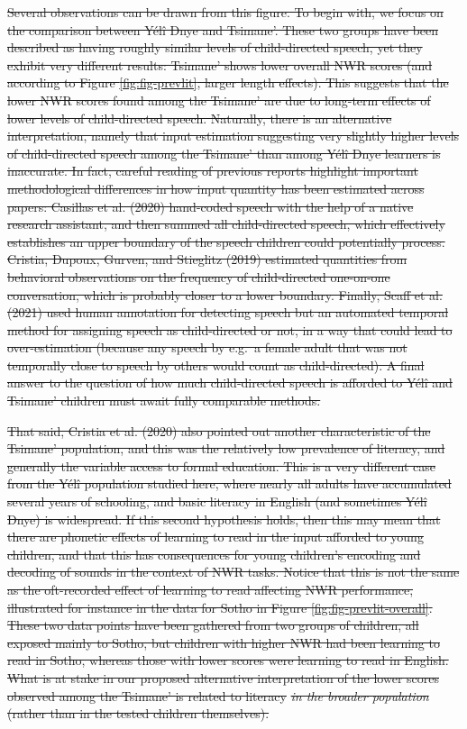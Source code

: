 \documentclass[ %
american, %
,man,floatsintext]{apa6} %
\providecommand{\DIFdeltex}[1]{{\protect\color{red}\sout{#1}}}                      %
\providecommand{\DIFdel}[1]{\texorpdfstring{\DIFdeltex{#1}}{}} %
\begin{document}
\DIFdel{Several observations can be drawn from this figure. To begin with, we focus on the comparison between Yélî Dnye and Tsimane'. These two groups have been described as having roughly similar levels of child-directed speech, yet they exhibit very different results: Tsimane' shows lower overall NWR scores (and according to Figure \ref{fig:fig-prevlit}, larger length effects). This suggests that the lower NWR scores found among the Tsimane' are due to long-term effects of lower levels of child-directed speech. Naturally, there is an alternative interpretation, namely that input estimation suggesting very slightly higher levels of child-directed speech among the Tsimane' than among Yélî Dnye learners is inaccurate. In fact, careful reading of previous reports highlight important methodological differences in how input quantity has been estimated across papers: Casillas et al. (2020) hand-coded speech with the help of a native research assistant, and then summed all child-directed speech, which effectively establishes an upper boundary of the speech children could potentially process. Cristia, Dupoux, Gurven, and Stieglitz (2019) estimated quantities from behavioral observations on the frequency of child-directed one-on-one conversation, which is probably closer to a lower boundary. Finally, Scaff et al. (2021) used human annotation for detecting speech but an automated temporal method for assigning speech as child-directed or not, in a way that could lead to over-estimation (because any speech by e.g.~a female adult that was not temporally close to speech by others would count as child-directed). A final answer to the question of how much child-directed speech is afforded to Yélî and Tsimane' children must await fully comparable methods.
}%

\DIFdel{That said, Cristia et al. (2020) also pointed out another characteristic of the Tsimane' population, and this was the relatively low prevalence of literacy, and generally the variable access to formal education. This is a very different case from the Yélî population studied here, where nearly all adults have accumulated several years of schooling, and basic literacy in English (and sometimes Yélî Dnye) is widespread. If this second hypothesis holds, then this may mean that there are phonetic effects of learning to read in the input afforded to young children, and that this has consequences for young children's encoding and decoding of sounds in the context of NWR tasks. Notice that this is not the same as the oft-recorded effect of learning to read affecting NWR performance, illustrated for instance in the data for Sotho in Figure \ref{fig:fig-prevlit-overall}. These two data points have been gathered from two groups of children, all exposed mainly to Sotho, but children with higher NWR had been learning to read in Sotho, whereas those with lower scores were learning to read in English. What is at stake in our proposed alternative interpretation of the lower scores observed among the Tsimane' is related to literacy }\emph{\DIFdel{in the broader population}} %
\DIFdel{(rather than in the tested children themselves). }%
\end{document}
